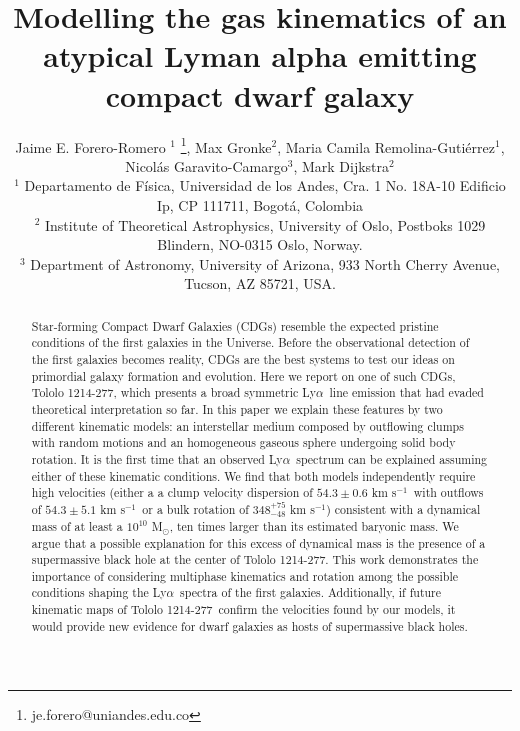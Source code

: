 \documentclass[a4,useAMS,usenatbib,usegraphicx]{mn2e}
\newcommand{\tol}{Tololo 1214-277}
\newcommand{\lya}{Ly$\alpha$}
\newcommand{\sigmaclump}{$54.3\pm 0.6$ km s$^{-1}$}
\newcommand{\inftyclump}{$54.3\pm 5.1$ km s$^{-1}$}
\begin{document}
\title[An atypical \lya\ dwarf galaxy]{
Modelling the gas kinematics of an atypical Lyman alpha emitting compact dwarf galaxy}
\author[J.E. Forero-Romero et al.]
{Jaime E. Forero-Romero $^{1}$ \thanks{je.forero@uniandes.edu.co},
Max Gronke$^2$, 
Maria Camila Remolina-Guti\'errez$^1$,
\newauthor
Nicol\'as Garavito-Camargo$^3$, 
Mark Dijkstra$^2$\\
$^1$ Departamento de F\'isica, Universidad de los Andes, Cra. 1
  No. 18A-10 Edificio Ip, CP 111711, Bogot\'a, Colombia \\
$^2$ Institute of Theoretical Astrophysics, University of Oslo,
Postboks 1029 Blindern, NO-0315 Oslo, Norway.\\
$^3$ Department of Astronomy, University of Arizona, 933 North Cherry
Avenue, Tucson, AZ 85721, USA. 
}


\maketitle


\begin{abstract}
  Star-forming Compact Dwarf Galaxies (CDGs) resemble the expected
  pristine conditions of the first galaxies in the Universe.    
Before the observational detection of the first galaxies becomes
reality, CDGs are the best systems to test our ideas on primordial
galaxy formation and evolution.    
Here we report on one of such CDGs, \tol, which presents
a broad symmetric \lya\ line emission that had evaded theoretical
interpretation so far. 
In this paper we explain these features by two different kinematic models: 
an interstellar medium composed by outflowing clumps with 
random motions and an homogeneous gaseous sphere undergoing solid body
rotation.
It is the first time that an observed \lya\ spectrum can be explained
assuming either of these kinematic conditions.
We find that both models independently require high velocities
(either a  a clump velocity dispersion of \sigmaclump\ with outflows of
\inftyclump\ or a bulk rotation of $348^{+75}_{-48}$ km s$^{-1}$)
consistent with a dynamical mass of at 
least a $10^{10}$ M$_{\odot}$, ten times larger than its estimated baryonic mass.   
We argue that a possible explanation for this excess of
dynamical mass is the presence of a supermassive black hole at the
center of \tol. 
This work demonstrates the importance of considering multiphase
kinematics and rotation among the possible conditions shaping the
\lya\ spectra of the first galaxies.  
Additionally, if future kinematic maps of \tol\ confirm the 
velocities found by our models, it would provide new
evidence for dwarf galaxies as hosts of supermassive black
holes.  
\end{abstract}
\end{document}
